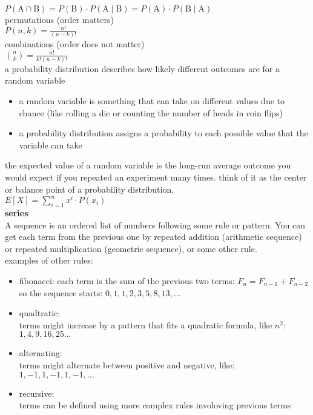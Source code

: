 \documentclass{article}
\begin{document}
$P(\text{A} \cap \text{B}) = P(\text{B}) \cdot P(\text{A} \mid \text{B}) = P(\text{A}) \cdot P(\text{B} \mid \text{A})$\\

permutations (order matters)\\
$P(n, k) = \frac{n!}{(n - k)!}$\\

combinations (order does not matter)\\
$\binom{n}{k} = \frac{n!}{k!(n - k)!}$\\

a probability distribution describes how likely different outcomes are for a random variable
	\begin{itemize}
		\item a random variable is something that can take on different values due to chance (like rolling a die or counting the number of heads in coin flips)
		\item a probability distribution assigns a probability to each possible value that the variable can take
	\end{itemize}

the expected value of a random variable is the long-run average outcome you would expect if you repeated an experiment many times. think of it as the center or balance point of a probability distribution.\\

$E[X] = \sum_{i=1}^{n} x^i \cdot P(x_i)$\\

\textbf{series}\\

A sequence is an ordered list of numbers following some rule or pattern. You can get each term from the previous one by repeated addition (arithmetic sequence) or repeated multiplication (geometric sequence), or some other rule.\\

examples of other rules:
	\begin{itemize}
		\item fibonacci: 
			each term is the sum of the previous two terms: $F_n = F_{n - 1} + F_{n - 2}$\\
			so the sequence starts: $0, 1, 1, 2, 3, 5, 8, 13, \ldots$
		\item quadtratic:\\
			terms might increase by a pattern that fits a quadratic formula, like $n^2$:\\
			$1, 4, 9, 16, 25 \ldots$
		\item alternating:\\
			terms might alternate between positive and negative, like:\\
			$1, -1, 1, -1, 1, -1, \ldots$
		\item recursive:\\
			terms can be defined using more complex rules involoving previous terms
	\end{itemize}
\end{document}
